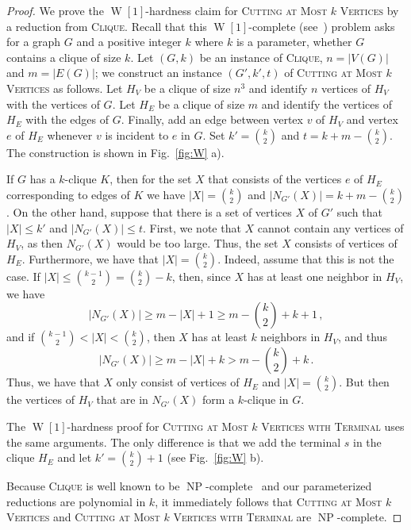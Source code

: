 \documentclass[a4paper,11pt]{article}
\theoremstyle{definition}
\theoremstyle{remark}
\newcommand{\card}[1]{\left\lvert {#1} \right\rvert}
\DeclareMathOperator{\operatorClassNP}{NP}
\newcommand{\classNP}{\ensuremath{\operatorClassNP}}
\DeclareMathOperator{\operatorClassW}{W}
\newcommand{\classW}[1]{\ensuremath{\operatorClassW[#1]}}
\newcommand{\vboundG}[2]{\card{N_{#1}(#2)}}
\begin{document}
\begin{proof}
We prove the \classW{1}-hardness claim for \textsc{Cutting at Most  $k$ Vertices} by a reduction from  \textsc{Clique}. 
Recall that this \classW{1}-complete (see~\cite{DowneyF99}) problem asks for a graph $G$ and a positive integer $k$ where $k$ is a parameter, whether $G$ contains a clique of size $k$.
Let $(G,k)$ be an instance of \textsc{Clique}, $n=\card{V(G)}$ and $m=\card{E(G)}$; we construct an instance $(G',k',t)$ of \textsc{Cutting at Most  $k$ Vertices} as follows. Let $H_V$ be a clique of size $n^3$ and identify $n$ vertices of $H_V$ with the vertices of $G$. Let $H_E$ be a clique of size $m$ and identify the vertices of $H_E$ with the edges of $G$. Finally, add an edge between vertex $v$ of $H_V$ and vertex $e$ of $H_E$ whenever $v$ is incident to $e$ in $G$. Set $k' = \binom{k}{2}$ and $t = k + m - \binom{k}{2}$. The construction is shown in Fig.~\ref{fig:W} a).

If $G$ has a $k$-clique $K$, then for the set $X$ that consists of the vertices $e$ of $H_E$ corresponding to edges of $K$ we have $\card{X} = \binom{k}{2}$ and $\vboundG{G'}{X} = k + m - \binom{k}{2}$. On the other hand, suppose that there is a set of vertices $X$ of $G'$ such that $\card{X}\leq k'$ and $\vboundG{G'}{X}\leq t$.
 First, we note that $X$ cannot contain any vertices of $H_V$, as then $N_{G'}(X)$ would be too large. Thus, the set $X$ consists of vertices of $H_E$. Furthermore, we have that $\card{X} = \binom{k}{2}$. Indeed, assume that this is not the case. If $\card{X} \le \binom{k-1}{2} = \binom{k}{2} - k$, then, since $X$ has at least one neighbor in $H_V$, we have
\[\vboundG{G'}{X} \ge m - \card{X} + 1 \ge m - \binom{k}{2} + k + 1\,,\]
and if $\binom{k-1}{2} < \card{X} < \binom{k}{2}$, then $X$ has at least $k$ neighbors in $H_V$, and thus
\[\vboundG{G'}{X} \ge m - \card{X} + k > m - \binom{k}{2} + k\,.\]
Thus, we have that $X$ only consist of vertices of $H_E$ and $\card{X} = \binom{k}{2}$. But then the vertices of $H_V$ that are in $N_{G'}(X)$ form a $k$-clique in $G$.

The \classW{1}-hardness proof for \textsc{Cutting at Most  $k$ Vertices with Terminal} uses the same arguments. The only difference is that we add the terminal $s$ in the clique $H_E$ and let $k'=\binom{k}{2}+1$ (see Fig.~\ref{fig:W} b).

Because \textsc{Clique} is well known to be \classNP-complete~\cite{GareyJ79} and our parameterized reductions are polynomial in $k$, it immediately follows that \textsc{Cutting at Most  $k$ Vertices} and \textsc{Cutting at Most  $k$ Vertices with Terminal} are \classNP-complete.
\end{proof}
\end{document}
